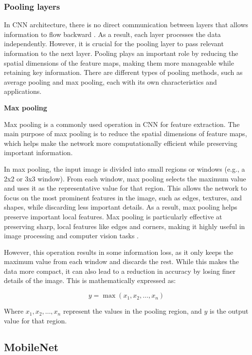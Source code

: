 \subsubsection{Pooling layers}

In CNN architecture, there is no direct communication between layers that allows information to flow backward \cite{zhao2024improved}. As a result, each layer processes the data independently. However, it is crucial for the pooling layer to pass relevant information to the next layer. Pooling plays an important role by reducing the spatial dimensions of the feature maps, making them more manageable while retaining key information. There are different types of pooling methods, such as average pooling and max pooling, each with its own characteristics and applications. 

\textbf{Max pooling}


Max pooling is a commonly used operation in CNN for feature extraction. The main purpose of max pooling is to reduce the spatial dimensions of feature maps, which helps make the network more computationally efficient while preserving important information.

In max pooling, the input image is divided into small regions or windows (e.g., a 2x2 or 3x3 window). From each window, max pooling selects the maximum value and uses it as the representative value for that region. This allows the network to focus on the most prominent features in the image, such as edges, textures, and shapes, while discarding less important details. As a result, max pooling helps preserve important local features. Max pooling is particularly effective at preserving sharp, local features like edges and corners, making it highly useful in image processing and computer vision tasks \cite{zhao2024improved}.

However, this operation results in some information loss, as it only keeps the maximum value from each window and discards the rest. While this makes the data more compact, it can also lead to a reduction in accuracy by losing finer details of the image. This is mathematically expressed as: 

\begin{equation}
 y = \max(x_1, x_2, \dots, x_n)
 \label{maxpooling}
\end{equation}

Where \(x_1, x_2, \dots, x_n\) represent the values in the pooling region, and \(y\) is the output value for that region.

 
\subsection{MobileNet}

